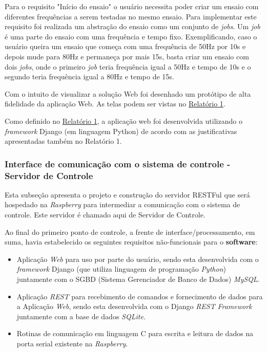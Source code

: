     Para o requisito "Início do ensaio" o usuário necessita poder criar um ensaio com diferentes frequências a serem testadas no mesmo ensaio.
    Para implementar este requisito foi realizada um abstração do ensaio como um conjunto de \textit{jobs}.
    Um \textit{job} é uma parte do ensaio com uma frequência e tempo fixo. Exemplificando, caso o usuário queira um ensaio que começa com uma
    frequência de 50Hz por 10s e depois mude para 80Hz e permaneça por mais 15s, basta criar um ensaio com dois \textit{jobs}, onde o primeiro
    \textit{job} teria frequência igual a 50Hz e tempo de 10s e o segundo teria frequência igual a 80Hz e tempo de 15s.
    
    Com o intuito de visualizar a solução Web foi desenhado um protótipo de alta fidelidade da aplicação Web. 
    As telas podem ser vistas no \href{https://drive.google.com/file/d/0B5InkGKx6O-MR1B3eVYzZFpjQ3c/view?usp=sharing}{Relatório 1}.
    
    Como definido no \href{https://drive.google.com/file/d/0B5InkGKx6O-MR1B3eVYzZFpjQ3c/view?usp=sharing}{Relatório 1},
    a aplicação web foi desenvolvida utilizando o \textit{framework} Django (em linguagem Python) de acordo com as justificativas
    apresentadas também no Relatório 1. 

\subsubsection{\textbf{Interface de comunicação com o sistema de controle - Servidor de Controle}}
   
   Esta subseção apresenta o projeto e construção do servidor RESTFul que será hospedado na \textit{Raspberry} para intermediar a comunicação
   com o sistema de controle. Este servidor é chamado aqui de Servidor de Controle.
  
    
Ao final do primeiro ponto de controle, a frente de interface/processamento, em suma, havia estabelecido os seguintes requisitos não-funcionais para o \textbf{software}:

\begin{itemize}
    \item Aplicação \textit{Web} para uso por parte do usuário, sendo esta desenvolvida com o \textit{framework} Django (que utiliza linguagem de programação \textit{Python}) juntamente com o SGBD (Sistema Gerenciador de Banco de Dados) \textit{MySQL}.
    \item Aplicação \textit{REST} para recebimento de comandos e fornecimento de dados para a Aplicação \textit{Web}, sendo esta desenvolvida com o Django \textit{REST} \textit{Framework} juntamente com a base de dados \textit{SQLite}.
    \item Rotinas de comunicação em linguagem C para escrita e leitura de dados na porta serial existente na \textit{Raspberry}.
\end{itemize}


